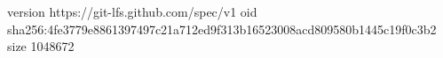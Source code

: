 version https://git-lfs.github.com/spec/v1
oid sha256:4fe3779e8861397497c21a712ed9f313b16523008acd809580b1445c19f0c3b2
size 1048672
